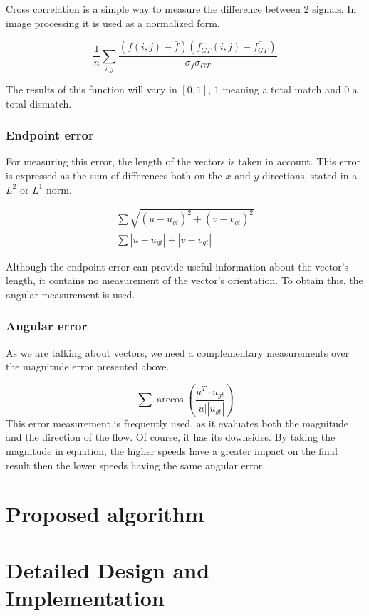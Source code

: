 \documentclass[12pt,a4paper,twoside]{report}
\begin{document}
Cross correlation is a simple way to measure the difference between 2 signals. In image processing it is used as a normalized form. 

\begin{equation}
\frac{1}{n}\sum_{i,j} \frac{(f(i,j) - \bar{f})(f_{GT}(i,j) - \bar{f_{GT}})}{\sigma_f \sigma_{GT}}
\end{equation}


The results of this function will vary in $[0,1]$, $1$ meaning a total match and $0$ a total dismatch.
\subsection{Endpoint error}
For measuring this error, the length of the vectors is taken in account. This error is expressed as the sum of differences both on the $x$ and $y$ directions, stated in a $L^2$ or $L^1$ norm.

\begin{equation}
\begin{split}
\sum  \sqrt{(u-u_{gt})^2+(v-v_{gt})^2} \\ 
\sum |u-u_{gt}|+|v-v_{gt}|
\end{split}
\end{equation}

Although the endpoint error can provide useful information about the vector's length, it contains no measurement of  the vector's orientation. To obtain this, the angular measurement is used.
\subsection{Angular error}
As we are talking about vectors, we need a complementary measurements over the magnitude error presented above.


\begin{equation}
\sum  \arccos \left( \frac{u^T \cdot u_{gt}}{|u||u_{gt}|}\right)
\end{equation}
 This error measurement is frequently used, as it evaluates both the magnitude and the direction of the flow. Of course, it has its downsides. By taking the magnitude in equation, the higher speeds have a greater impact on the final result then the lower speeds having the same angular error. 

\chapter{Proposed algorithm}

\chapter{Detailed Design and Implementation}
\end{document}
